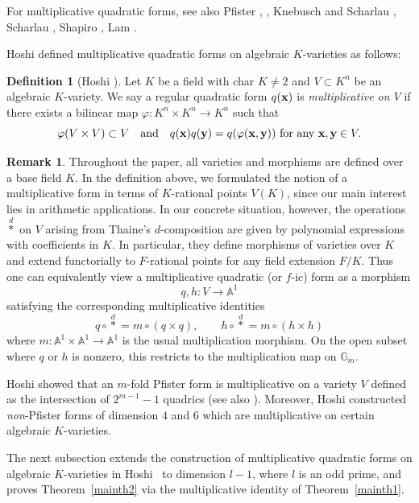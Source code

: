 \documentclass[a4paper, 11pt]{amsart}
\theoremstyle{plain}
\theoremstyle{definition}
\newtheorem{defn}[thm]{Definition}
\newtheorem{remark}[thm]{Remark}
\numberwithin{equation}{section}
\begin{document}
For multiplicative quadratic forms, 
see also Pfister \cite{Pfi66}, \cite{Pfi67}, 
Knebusch and Scharlau \cite{KS80}, Scharlau \cite{Sch85}, 
Shapiro \cite{Sha00}, Lam \cite{Lam05}. 

Hoshi \cite{Hos03} defined multiplicative quadratic forms 
on algebraic $K$-varieties as follows:

\begin{defn}[{Hoshi \cite[Section 2]{Hos03}}]
Let $K$ be a field with {\rm char} $K\neq 2$ and 
$V \subset K^n$ be an algebraic $K$-variety. 
We say a regular
quadratic form $q({\bf x})$ is {\it multiplicative on $V$} 
if there exists a bilinear map 
$\varphi :K^n \times K^n \rightarrow K^n$ such that
\[
\varphi(V \times V) \subset V \quad \mbox{and}\quad q({\bf x})q({\bf y})=q(\varphi({\bf x,y}))\mbox{ for any }{\bf x,y} \in V.
\]
\end{defn}

\begin{remark}
Throughout the paper, all varieties and morphisms are defined over a
base field $K$. 
In the definition above, we formulated the notion of a multiplicative form in terms of $K$-rational points $V(K)$, since our main interest lies in arithmetic applications. 
In our concrete situation, however, the operations $\overset{d}{\ast}$ on $V$ arising from Thaine's $d$-composition are given by polynomial expressions with coefficients in $K$. 
In particular, they define morphisms of varieties over $K$ and extend functorially to $F$-rational points for any field extension $F/K$. Thus one can equivalently view a multiplicative quadratic (or $f$-ic) form as a morphism
\[
  q,h \colon V \longrightarrow \mathbb{A}^1
\]
satisfying the corresponding multiplicative identities
\[
  q \circ \overset{d}{\ast} = m \circ (q \times q),
  \qquad
  h \circ \overset{d}{\ast} = m \circ (h \times h)
\]
where \(m:\mathbb A^1\times\mathbb A^1\to\mathbb A^1\) is the usual multiplication morphism. 
On the open subset where $q$ or $h$ is nonzero, this restricts to the multiplication map on ${\mathbb G}_m$.
\end{remark}

Hoshi \cite[Proposition~1]{Hos03} showed that an $m$-fold Pfister form is multiplicative on a variety $V$ defined as the intersection of $2^{m-1}-1$ quadrics (see also \cite[Example 2]{Hos03}). 
Moreover, Hoshi \cite[Theorem~4, Theorem~6]{Hos03} 
constructed {\it non}-Pfister forms of dimension $4$ and $6$ 
which are multiplicative on certain algebraic $K$-varieties. 
%

The next subsection extends the construction of multiplicative
quadratic forms on algebraic $K$-varieties in Hoshi~\cite{Hos03} to dimension $l-1$, where $l$ is an odd prime, and proves Theorem~\ref{mainth2} via the multiplicative identity of Theorem~\ref{mainth1}.
\end{document}
